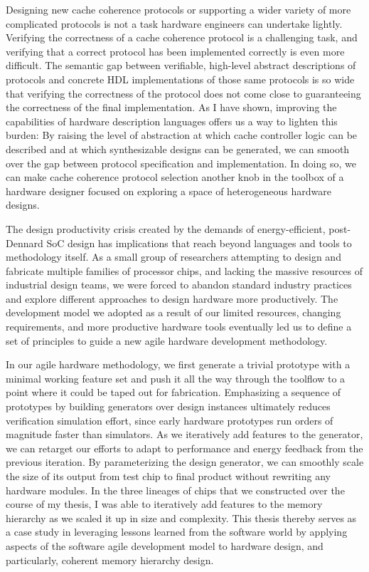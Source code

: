 Designing new cache coherence protocols or supporting a wider variety of more complicated protocols is not a task hardware engineers can undertake lightly.
Verifying the correctness of a cache coherence protocol is a challenging task, and
verifying that a correct protocol has been implemented correctly is even more difficult.
The semantic gap between verifiable, high-level abstract descriptions of protocols and 
concrete HDL implementations of those same protocols is so wide that verifying the correctness of the protocol
does not come close to guaranteeing the correctness of the final implementation.
As I have shown, improving the capabilities of hardware description languages offers us a way to lighten this burden:
By raising the level of abstraction at which cache controller logic can be described and at which synthesizable designs can be generated,
we can smooth over the gap between protocol specification and implementation.
In doing so, we can make cache coherence protocol selection another knob in the toolbox of a hardware designer focused on exploring a space of heterogeneous hardware designs.

The design productivity crisis created by the demands of energy-efficient, post-Dennard SoC design has implications that reach beyond
languages and tools to methodology itself.
As a small group of researchers attempting to design and fabricate multiple families of processor chips,
and lacking the massive resources of industrial design teams,
we were forced to abandon standard industry practices and explore different
approaches to design hardware more productively.
The development model we adopted as a result of our limited resources, changing requirements, and more productive hardware tools
eventually led us to define a set of principles to guide a new agile hardware development methodology.

In our agile hardware methodology, we first generate a trivial prototype with a minimal working feature set and push it all the way through the toolflow to a point where it could be taped out for fabrication.
Emphasizing a sequence of prototypes by building generators over design instances ultimately reduces verification simulation effort, 
since early hardware prototypes run orders of magnitude faster than simulators.
As we iteratively add features to the generator, we can retarget our efforts to adapt to performance and energy feedback from the previous iteration.
By parameterizing the design generator, we can smoothly scale the size of its output from test chip to final product without rewriting any hardware modules.
In the three lineages of chips that we constructed over the course of my thesis, I was able to iteratively add features to the memory hierarchy as we scaled it up in size and complexity.
This thesis thereby serves as a case study in leveraging lessons learned from the software world by
applying aspects of the software agile development model to hardware design,
and particularly, coherent memory hierarchy design.

